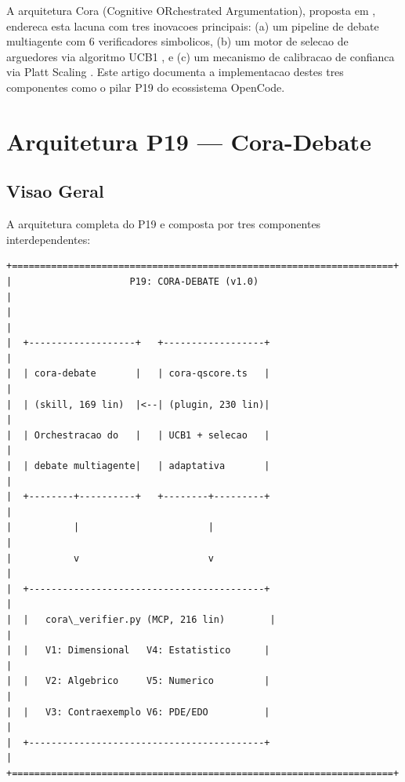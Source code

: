 \documentclass[5p]{elsarticle}
\begin{document}
A arquitetura Cora (Cognitive ORchestrated Argumentation), proposta em \cite{cora2026}, endereca esta lacuna com tres inovacoes principais: (a) um pipeline de debate multiagente com 6 verificadores simbolicos, (b) um motor de selecao de arguedores via algoritmo UCB1 \cite{auer2002}, e (c) um mecanismo de calibracao de confianca via Platt Scaling \cite{platt1999}. Este artigo documenta a implementacao destes tres componentes como o pilar P19 do ecossistema OpenCode.

\section{Arquitetura P19 --- Cora-Debate}

\subsection{Visao Geral}

A arquitetura completa do P19 e composta por tres componentes interdependentes:

\begin{verbatim}
+====================================================================+
|                     P19: CORA-DEBATE (v1.0)                         |
|                                                                     |
|  +-------------------+   +------------------+                       |
|  | cora-debate       |   | cora-qscore.ts   |                       |
|  | (skill, 169 lin)  |<--| (plugin, 230 lin)|                       |
|  | Orchestracao do   |   | UCB1 + selecao   |                       |
|  | debate multiagente|   | adaptativa       |                       |
|  +--------+----------+   +--------+---------+                       |
|           |                       |                                  |
|           v                       v                                  |
|  +------------------------------------------+                       |
|  |   cora\_verifier.py (MCP, 216 lin)        |                       |
|  |   V1: Dimensional   V4: Estatistico      |                       |
|  |   V2: Algebrico     V5: Numerico         |                       |
|  |   V3: Contraexemplo V6: PDE/EDO          |                       |
|  +------------------------------------------+                       |
+====================================================================+
\end{verbatim}
\end{document}
